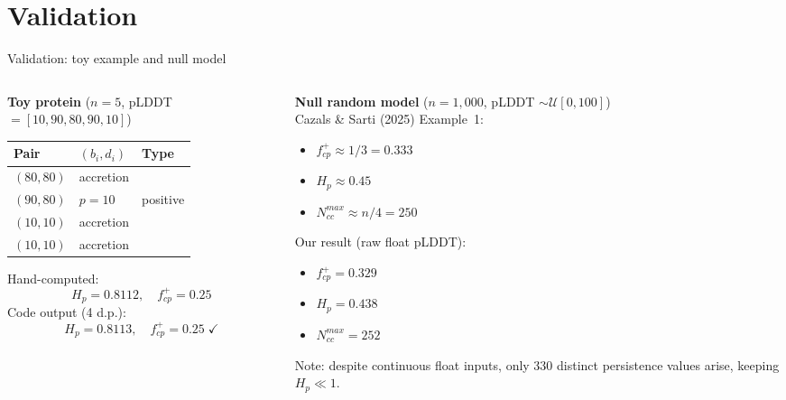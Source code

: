 \documentclass[aspectratio=169, 10pt]{beamer}
\begin{document}
\section{Validation}

\begin{frame}{Validation: toy example and null model}
  \begin{columns}[T]
    \begin{column}{0.48\textwidth}
      \textbf{Toy protein} ($n=5$, pLDDT $= [10, 90, 80, 90, 10]$)
      \vspace{4pt}

      \begin{tabular}{@{}lll@{}}
        \toprule
        Pair & $(b_i, d_i)$ & Type \\
        \midrule
        $(80, 80)$ & accretion & \\
        $(90, 80)$ & $p=10$ & positive \\
        $(10, 10)$ & accretion & \\
        $(10, 10)$ & accretion & \\
        \bottomrule
      \end{tabular}
      \vspace{6pt}

      Hand-computed:
      \[
        H_p = 0.8112, \quad f^+_{cp} = 0.25
      \]
      Code output (4 d.p.):
      \[
        H_p = 0.8113, \quad f^+_{cp} = 0.25 \;\checkmark
      \]
    \end{column}
    \begin{column}{0.48\textwidth}
      \textbf{Null random model} ($n=1{,}000$,
      pLDDT $\sim \mathcal{U}[0,100]$)\\[4pt]

      Cazals \& Sarti (2025) Example~1:
      \begin{itemize}
        \item $f^+_{cp} \approx 1/3 = 0.333$
        \item $H_p \approx 0.45$
        \item $N_{cc}^{max} \approx n/4 = 250$
      \end{itemize}
      \vspace{6pt}

      Our result (raw float pLDDT):
      \begin{itemize}
        \item $f^+_{cp} = 0.329$ \;\checkmark
        \item $H_p = 0.438$ \;\checkmark
        \item $N_{cc}^{max} = 252$ \;\checkmark
      \end{itemize}
      \vspace{4pt}
      \footnotesize Note: despite continuous float inputs, only 330 distinct
      persistence values arise, keeping $H_p \ll 1$.
    \end{column}
  \end{columns}
\end{frame}
\end{document}
